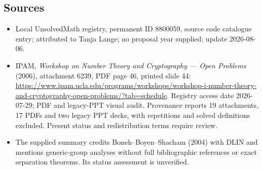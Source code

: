 \documentclass[11pt]{article}
\begin{document}
\subsection{Sources}
\begin{itemize}
\item Local UnsolvedMath registry, permanent ID 8800059, source code catalogue entry; attributed to Tanja Lange; no proposal year supplied; update 2026-08-06.
\item IPAM, \emph{Workshop on Number Theory and Cryptography --- Open Problems} (2006), attachment 6239, PDF page 46, printed slide 44: \url{https://www.ipam.ucla.edu/programs/workshops/workshop-i-number-theory-and-cryptography-open-problems/?tab=schedule}. Registry access date 2026-07-29; PDF and legacy-PPT visual audit. Provenance reports 19 attachments, 17 PDFs and two legacy PPT decks, with repetitions and solved definitions excluded. Present status and redistribution terms require review.
\item The supplied summary credits Boneh--Boyen--Shacham (2004) with DLIN and mentions generic-group analyses without full bibliographic references or exact separation theorems. Its status assessment is unverified.
\end{itemize}
\end{document}

